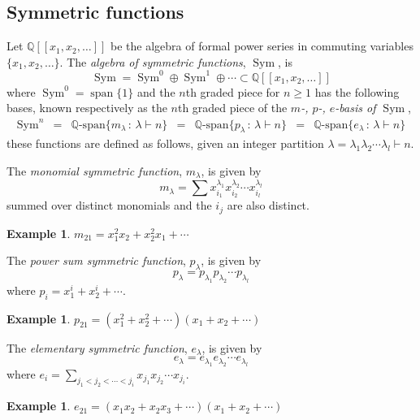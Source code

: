 \documentclass[12pt]{amsart}  %
\theoremstyle{definition}
\newtheorem{example}[theorem]{Example}
\theoremstyle{remark}
\numberwithin{equation}{section}
\newcommand{\bbQ}{\mathbb{Q}}
\newcommand{\suchthat}{\,:\,}
\newcommand{\spam}{\operatorname{span}}
\newcommand{\Sym}{\ensuremath{\operatorname{Sym}}}
\newcommand{\enc}{{e}}         	%
\newcommand{\mnc}{{m}}           	%
\newcommand{\pnc}{{p}}                %
\newcommand\svw[1]{{\color{black}{#1}}}
\begin{document}
\subsection{Symmetric functions}
Let $\mathbb{Q}[[x_1,x_2,\dots]]$ be the algebra of formal power series in commuting variables $\{x_1,x_2,\dots\}$.
The \emph{algebra of symmetric functions}, {$\Sym$,} is
$$\Sym = \Sym ^0 \oplus \Sym ^1 \oplus \cdots \subset \bbQ [[x_1, x_2, \ldots ]]$$ where $\Sym ^0 = \spam \{1\}$ and 
{the} $n$th graded piece for $n\geq 1$ has the following bases, known respectively as the $n$th graded piece of the \emph{$\mnc$-, $\pnc$-, $\enc$-basis of $\Sym$},
{$$\begin{array}{rclclcc}
\Sym ^n&=&\mathbb{Q}\text{-span}\{ m_\lambda \suchthat \lambda\vdash n\} &=&\mathbb{Q}\text{-span}\{ p_\lambda \suchthat \lambda\vdash n\}&=& \mathbb{Q}\text{-span}\{ e_\lambda \suchthat \lambda\vdash n\} 
\end{array}$$}\svw{where} these functions are defined as follows, {given an integer partition} $\lambda = \lambda_1\lambda_2\cdots \lambda_{l}\vdash n$.



The \emph{monomial symmetric function}, $m_\lambda$, is given by
$$m_\lambda = \sum x_{i_1}^{\lambda _1}x_{i_2}^{\lambda _2}\cdots x_{i_{l}}^{\lambda _{l}}$$summed over distinct monomials and the $i_j$ are also distinct.

\begin{example}\label{ex:monomials}
$m_{21} = x_1^2x_2 + x_2^2x_1+ \cdots$
\end{example}

The \emph{power sum symmetric function}, $p_\lambda$, is given by
$$p_\lambda = p_{\lambda _1}p_{\lambda _2}\cdots p_{\lambda _{l}}$$where {$p_{i} = x_1^{i}+x_2^{i}+\cdots$.}

\begin{example}\label{ex:powers}
$p_{21} = (x_1^2+x_2^2+ \cdots)(x_1+x_2+\cdots)$
\end{example}

The \emph{elementary symmetric function}, $e_\lambda$, is given by
$$e_\lambda = e_{\lambda _1}e_{\lambda _2}\cdots e_{\lambda _{l}}$$where {$e_{i} = \sum_{j_1<j_2<\cdots <j_{i}} x_{j_1}x_{j_2}\cdots x_{j_{i}}$.}

\begin{example}\label{ex:elementaries}
$e_{21} = (x_1x_2+x_2x_3+ \cdots)(x_1+x_2+\cdots)$
\end{example}
\end{document}
